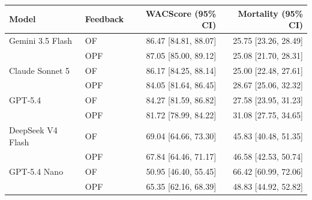 \begin{tabular}{llrr}
    \toprule
    Model & Feedback & WACScore (95\% CI) & Mortality (95\% CI) \\
    \midrule
    Gemini 3.5 Flash & OF & 86.47 [84.81, 88.07] & 25.75 [23.26, 28.49] \\
     & OPF & 87.05 [85.00, 89.12] & 25.08 [21.70, 28.31] \\
    \addlinespace
    Claude Sonnet 5 & OF & 86.17 [84.25, 88.14] & 25.00 [22.48, 27.61] \\
     & OPF & 84.05 [81.64, 86.45] & 28.67 [25.06, 32.32] \\
    \addlinespace
    GPT-5.4 & OF & 84.27 [81.59, 86.82] & 27.58 [23.95, 31.23] \\
     & OPF & 81.72 [78.99, 84.22] & 31.08 [27.75, 34.65] \\
    \addlinespace
    DeepSeek V4 Flash & OF & 69.04 [64.66, 73.30] & 45.83 [40.48, 51.35] \\
     & OPF & 67.84 [64.46, 71.17] & 46.58 [42.53, 50.74] \\
    \addlinespace
    GPT-5.4 Nano & OF & 50.95 [46.40, 55.45] & 66.42 [60.99, 72.06] \\
     & OPF & 65.35 [62.16, 68.39] & 48.83 [44.92, 52.82] \\
    \bottomrule
\end{tabular}
